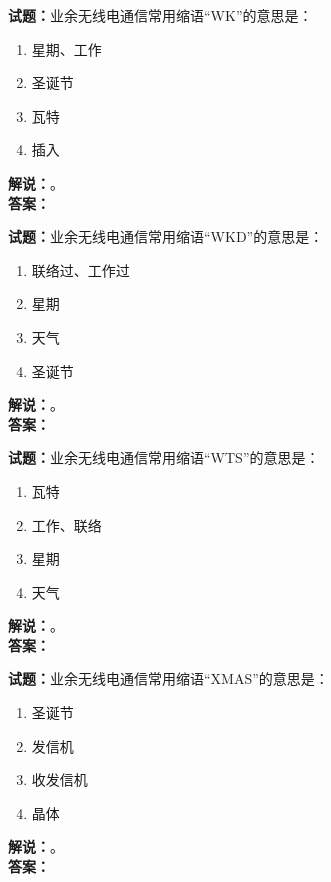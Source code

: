 \documentclass{ctexbook}
\begin{document}
\vspace{\baselineskip}

\noindent\textbf{试题：}业余无线电通信常用缩语“WK”的意思是：
\begin{enumerate}[leftmargin=3em]
  \item 星期、工作
  \item 圣诞节
  \item 瓦特
  \item 插入
\end{enumerate}
\noindent\textbf{解说：}\textbf{}。\\\noindent\textbf{答案：}

\vspace{\baselineskip}

\noindent\textbf{试题：}业余无线电通信常用缩语“WKD”的意思是：
\begin{enumerate}[leftmargin=3em]
  \item 联络过、工作过
  \item 星期
  \item 天气
  \item 圣诞节
\end{enumerate}
\noindent\textbf{解说：}\textbf{}。\\\noindent\textbf{答案：}

\vspace{\baselineskip}

\noindent\textbf{试题：}业余无线电通信常用缩语“WTS”的意思是：
\begin{enumerate}[leftmargin=3em]
  \item 瓦特
  \item 工作、联络
  \item 星期
  \item 天气
\end{enumerate}
\noindent\textbf{解说：}\textbf{}。\\\noindent\textbf{答案：}

\vspace{\baselineskip}

\noindent\textbf{试题：}业余无线电通信常用缩语“XMAS”的意思是：
\begin{enumerate}[leftmargin=3em]
  \item 圣诞节
  \item 发信机
  \item 收发信机
  \item 晶体
\end{enumerate}
\noindent\textbf{解说：}\textbf{}。\\\noindent\textbf{答案：}
\end{document}
